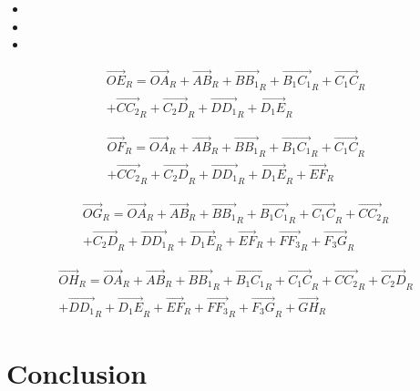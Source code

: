 \documentclass[12pt,a4paper]{article}
\begin{document}
	\begin{itemize}
		\item
		\item 
		\item 
	\end{itemize}
	
	
	\medbreak
	
	\medbreak
	
	\medbreak
	
	\medbreak
	
	
	
	
	\begin{equation}
		\begin{split}
			\vec{OE}_R=\vec{OA}_R+\vec{AB}_R+\vec{B B_1}_R+\vec{B_1 C_1}_R+\vec{C_1 C}_R\\+\vec{C C_2}_R+\vec{C_2 D}_R+\vec{D D_1}_R+\vec{D_1 E}_R
		\end{split}
	\end{equation}
	
	\begin{equation}
		\begin{split}
			\vec{OF}_R=\vec{OA}_R+\vec{AB}_R+\vec{B B_1}_R+\vec{B_1 C_1}_R+\vec{C_1 C}_R\\+\vec{C C_2}_R+\vec{C_2 D}_R+\vec{D D_1}_R+\vec{D_1 E}_R+\vec{E F}_R
		\end{split}
	\end{equation}
	
	\begin{equation}
		\begin{split}
			\vec{OG}_R=\vec{OA}_R+\vec{AB}_R+\vec{B B_1}_R+\vec{B_1 C_1}_R+\vec{C_1 C}_R+\vec{C C_2}_R\\+\vec{C_2 D}_R+\vec{D D_1}_R+\vec{D_1 E}_R+\vec{E F}_R+\vec{F F_3}_R+\vec{F_3 G}_R
		\end{split}
	\end{equation}
	
	\begin{equation}
		\begin{split}
			\vec{OH}_R=\vec{OA}_R+\vec{AB}_R+\vec{B B_1}_R+\vec{B_1 C_1}_R+\vec{C_1 C}_R+\vec{C C_2}_R+\vec{C_2 D}_R\\+\vec{D D_1}_R+\vec{D_1 E}_R+\vec{E F}_R+\vec{F F_3}_R+\vec{F_3 G}_R+\vec{G H}_R
		\end{split}
	\end{equation}
	
	
	\section{Conclusion}
	
	
\end{document}
